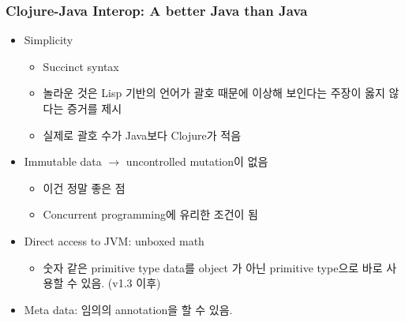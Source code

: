 \begin{frame}
\frametitle{Clojure-Java Interop: A better Java than Java}

\begin{itemize}
\item Simplicity
  \begin{itemize}
  \item Succinct syntax
  \item 놀라운 것은 Lisp 기반의 언어가 괄호 때문에 이상해 보인다는
    주장이 옳지 않다는 증거를 제시
  \item 실제로 괄호 수가 Java보다 Clojure가 적음
  \end{itemize}

\item Immutable data $\rightarrow$ uncontrolled mutation이 없음
  \begin{itemize}
  \item 이건 정말 좋은 점
  \item Concurrent programming에 유리한 조건이 됨
  \end{itemize}

\item Direct access to JVM: unboxed math
  \begin{itemize}
  \item 숫자 같은 primitive type data를 object 가 아닌 primitive
    type으로 바로 사용할 수 있음. (v1.3 이후)
  \end{itemize}

\item Meta data: 임의의 annotation을 할 수 있음.
\end{itemize}

\end{frame}
